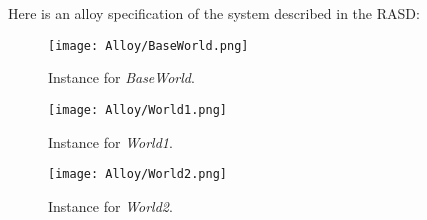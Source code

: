 Here is an alloy specification of the system described in the RASD: 
\vspace{2cm}

\newpage

\begin{figure}[H]
    \begin{center}
        \texttt{[image: Alloy/BaseWorld.png]}
        \caption{Instance for \textit{BaseWorld}.}
        \label{fig:baseWorld}%
    \end{center}
\end{figure}

\begin{figure}[H]
    \begin{center}
        \texttt{[image: Alloy/World1.png]}
        \caption{Instance for \textit{World1}.}
        \label{fig:World1}%
    \end{center}
\end{figure}


\begin{figure}[H]
    \begin{center}
        \texttt{[image: Alloy/World2.png]}
        \caption{Instance for \textit{World2}.}
        \label{fig:World2}%
    \end{center}
\end{figure}
